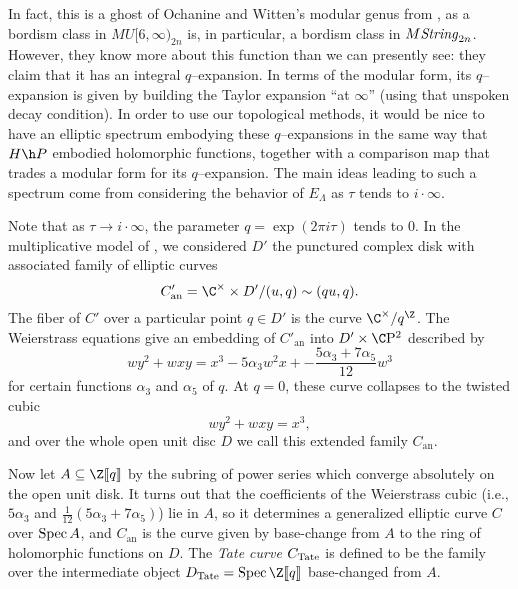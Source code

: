 In fact, this is a ghost of Ochanine and Witten's modular genus from , as a bordism class in $MU[6, \infty)_{2n}$ is, in particular, a bordism class in $M\mathit{String}_{2n}$.  However, they know more about this function than we can presently see: they claim that it has an integral $q$--expansion.  In terms of the modular form, its $q$--expansion is given by building the Taylor expansion ``at $\infty$'' (using that unspoken decay condition).  In order to use our topological methods, it would be nice to have an elliptic spectrum embodying these $q$--expansions in the same way that $H\h P$ embodied holomorphic functions, together with a comparison map that trades a modular form for its $q$--expansion.  The main ideas leading to such a spectrum come from considering the behavior of $E_\Lambda$ as $\tau$ tends to $i \cdot \infty$.

\begin{definition}
Note that as $\tau \to i \cdot \infty$, the parameter $q = \exp(2 \pi i \tau)$ tends to $0$.  In the multiplicative model of , we considered $D'$ the punctured complex disk with associated family of elliptic curves \[C'_{\mathrm{an}} = \C^\times \times D' / (u, q) \sim (qu, q).\]  The fiber of $C'$ over a particular point $q \in D'$ is the curve $\C^\times / q^{\Z}$. %
The Weierstrass equations give an embedding of $C'_{\mathrm{an}}$ into $D' \times \CP^2$ described by \[wy^2 + wxy = x^3 - 5 \alpha_3 w^2 x + -\frac{5 \alpha_3 + 7 \alpha_5}{12}w^3\] for certain functions $\alpha_3$ and $\alpha_5$ of $q$.  At $q = 0$, these curve collapses to the twisted cubic \[wy^2 + wxy = x^3,\] and over the whole open unit disc $D$ we call this extended family $C_{\mathrm{an}}$.

Now let $A \subseteq \Z\ps{q}$ by the subring of power series which converge absolutely on the open unit disk.  It turns out that the coefficients of the Weierstrass cubic (i.e., $5\alpha_3$ and $\frac{1}{12}(5\alpha_3+7\alpha_5)$) lie in $A$, so it determines a generalized elliptic curve $C$ over $\operatorname{Spec} A$, and $C_{\mathrm{an}}$ is the curve given by base-change from $A$ to the ring of holomorphic functions on $D$.  The \textit{Tate curve} $C_{\mathrm{Tate}}$ is defined to be the family over the intermediate object $D_{\Tate} = \Spec \Z\ps{q}$ base-changed from $A$.
\end{definition}

